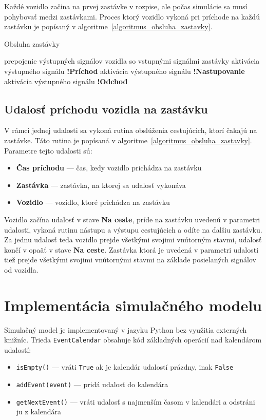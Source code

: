 Každé vozidlo začina na prvej zastávke v rozpise, ale počas simulácie sa musí pohybovať medzi zastávkami.
Proces ktorý vozidlo vykoná pri príchode na každú zastávku je popísaný v algoritme~\ref{algoritmus_obsluha_zastavky}.

\vspace*{\dimexpr0.5\baselineskip\relax}
\begin{algorithm}[H]\label{algoritmus_obsluha_zastavky}
\caption{Obsluha zastávky}
  prepojenie výstupných signálov vozidla so vstupnými signálmi zastávky\;
  aktivácia výstupného signálu \textbf{!Príchod}\;
  aktivácia výstupného signálu \textbf{!Nastupovanie}\;
  aktivácia výstupného signálu \textbf{!Odchod}\;
\end{algorithm}

\subsection*{Udalosť príchodu vozidla na zastávku}

V rámci jednej udalosti sa vykoná rutina obslúženia cestujúcich, ktorí čakajú na zastávke. Táto rutina je popísaná v algoritme~\ref{algoritmus_obsluha_zastavky}.
Parametre tejto udalosti sú:
\begin{itemize}
  \item \textbf{Čas príchodu} --- čas, kedy vozidlo prichádza na zastávku
  \item \textbf{Zastávka} --- zastávka, na ktorej sa udalosť vykonáva
  \item \textbf{Vozidlo} --- vozidlo, ktoré prichádza na zastávku
\end{itemize}

Vozidlo začína udalosť v stave \textbf{Na ceste}, príde na zastávku uvedenú v parametri udalosti, vykoná rutinu nástupu a výstupu cestujúcich a odíte na ďalšiu zastávku.
Za jednu udalosť teda vozidlo prejde všetkými svojimi vnútorným stavmi, udalosť končí v opaäť v stave \textbf{Na ceste}.
Zastávka ktorá je uvedená v parametri udalosti tiež prejde všetkými svojimi vnútornými stavmi na základe posielaných signálov od vozidla.

\section{Implementácia simulačného modelu}

Simulačný model je implementovaný v jazyku Python bez využitia externých knižníc.
Trieda \texttt{EventCalendar} obsahuje kód základných operácií nad kalendárom udalostí:
\begin{itemize}
  \item \texttt{isEmpty()} --- vráti \texttt{True} ak je kalendár udalostí prázdny, inak \texttt{False}
  \item \texttt{addEvent(event)} --- pridá udalosť do kalendára
  \item \texttt{getNextEvent()} --- vráti udalosť s najmenším časom v kalendári a odstráni ju z kalendára
\end{itemize}

